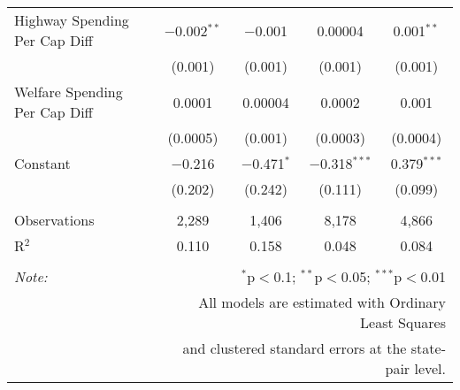 \begin{table}[!htbp]
\begin{tabular}{@{\extracolsep{5pt}}lcccc}
  Highway Spending Per Cap Diff & $-$0.002$^{**}$ & $-$0.001 & 0.00004 & 0.001$^{**}$ \\ 
  & (0.001) & (0.001) & (0.001) & (0.001) \\ 
  Welfare Spending Per Cap Diff & 0.0001 & 0.00004 & 0.0002 & 0.001 \\ 
  & (0.0005) & (0.001) & (0.0003) & (0.0004) \\ 
  Constant & $-$0.216 & $-$0.471$^{*}$ & $-$0.318$^{***}$ & 0.379$^{***}$ \\ 
  & (0.202) & (0.242) & (0.111) & (0.099) \\ 
 \hline \\[-1.8ex] 
Observations & 2,289 & 1,406 & 8,178 & 4,866 \\ 
R$^{2}$ & 0.110 & 0.158 & 0.048 & 0.084 \\ 
\hline 
\hline \\[-1.8ex] 
\textit{Note:}  & \multicolumn{4}{r}{$^{*}$p$<$0.1; $^{**}$p$<$0.05; $^{***}$p$<$0.01} \\ 
 & \multicolumn{4}{r}{All models are estimated with Ordinary Least Squares} \\ 
 & \multicolumn{4}{r}{and clustered standard errors at the state-pair level.} \\ 
\end{tabular} 
\end{table} 

